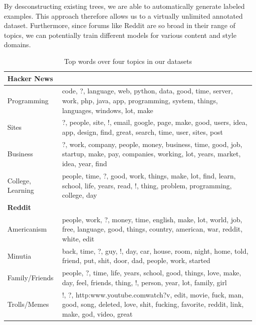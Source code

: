 \documentclass{article}
\begin{document}
By desconstructing existing trees, we are able to automatically generate
labeled examples. This approach therefore allows us to a virtually unlimited
annotated dataset. Furthermore, since forums like Reddit are so broad in their
range of topics, we can potentially train different models for various content
and style domains.

\begin{table}[ht]\footnotesize
  \begin{tabularx}{0.5\textwidth}{| l X |}
   \hline
   \textbf{Hacker News} & \\
   \hline
   Programming  & code, ?, language, web, python, data, good, time, server, work, php, 
   java, app, programming, system, things, languages, windows, lot, make \\

  Sites  & ?, people, site, !, email, google, page, make, good, users, idea, app, 
  design, find, great, search, time, user, sites, post \\

  Business  & ?, work, company, people, money, business, time, good, job, startup, make, 
  pay, companies, working, lot, years, market, idea, year, find \\

  College,  Learning  & people, time, ?, good, work, things, make, lot, find, learn, 
  school, life, years, read, !, thing, problem, programming, college, day \\
   \hline
   \textbf{Reddit} & \\
   \hline
  Americanism & people, work, ?, money, time, english, make, lot, world, job, free, 
  language, good, things, country, american, war, reddit, white, edit \\

  Minutia & back, time, ?, guy, !, day, car, house, room, night, home, told, friend, 
  put, shit, door, dad, people, work, started \\

  Family/Friends  & people, ?, time, life, years, school, good, things, love, make, day, 
  feel, friends, thing, !, person, year, lot, family, girl \\

  Trolls/Memes  & !, ?, http:\/\/www.youtube.com\/watch?v, edit, movie, fuck, man, good, 
  song, deleted, love, shit, fucking, favorite, reddit, link, make, god, video, great \\
   \hline
  \end{tabularx}
  \caption{Top words over four topics in our datasets}
  \label{table:lda}
\end{table}
\end{document}
